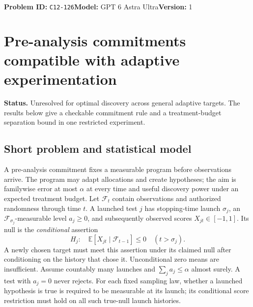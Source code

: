 \documentclass[11pt,a4paper]{article}
\newcommand{\E}{\mathbb E}
\begin{document}
\noindent\textbf{Problem ID:} \texttt{C12-126}\quad\textbf{Model:} GPT 6 Astra Ultra\quad\textbf{Version:} 1\par
\section*{Pre-analysis commitments compatible with adaptive experimentation}

\textbf{Status.} Unresolved for optimal discovery across general adaptive targets. The results below give a checkable commitment rule and a treatment-budget separation bound in one restricted experiment.

\subsection*{Short problem and statistical model}
A pre-analysis commitment fixes a measurable program before observations arrive. The program may adapt allocations and create hypotheses; the aim is familywise error at most $\alpha$ at every time and useful discovery power under an expected treatment budget.
Let $\mathcal F_t$ contain observations and authorized randomness through time $t$. A launched test $j$ has stopping-time launch $\sigma_j$, an $\mathcal F_{\sigma_j}$-measurable level $a_j\geq0$, and subsequently observed scores $X_{jt}\in[-1,1]$. Its null is the \emph{conditional} assertion
\[
 H_j:\quad \E[X_{jt}\mid\mathcal F_{t-1}]\leq0\quad(t>\sigma_j).
\]
A newly chosen target must meet this assertion under its claimed null after conditioning on the history that chose it. Unconditional zero means are insufficient. Assume countably many launches and $\sum_j a_j\leq\alpha$ almost surely. A test with $a_j=0$ never rejects. For each fixed sampling law, whether a launched hypothesis is true is required to be measurable at its launch; its conditional score restriction must hold on all such true-null launch histories.
\end{document}
